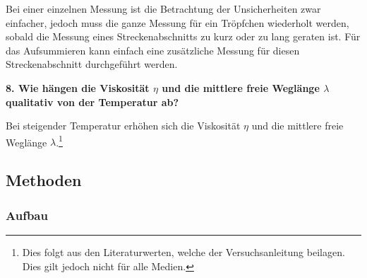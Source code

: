 	Bei einer einzelnen Messung ist die Betrachtung der Unsicherheiten zwar einfacher, jedoch muss die ganze Messung für ein Tröpfchen wiederholt werden, sobald die Messung eines Streckenabschnitts zu kurz oder zu lang geraten ist. Für das Aufsummieren kann einfach eine zusätzliche Messung für diesen Streckenabschnitt durchgeführt werden.

\vspace{0,5cm}
\noindent \textbf{8. Wie hängen die Viskosität $\eta$ und die mittlere freie Weglänge $\lambda$ qualitativ von der Temperatur ab?}

	Bei steigender Temperatur erhöhen sich die Viskosität $\eta$ und die mittlere freie Weglänge $\lambda$.\footnote{Dies folgt aus den Literaturwerten, welche der Versuchsanleitung beilagen. Dies gilt jedoch nicht für alle Medien.}
	
\subsection{Methoden}

\subsubsection{Aufbau}

